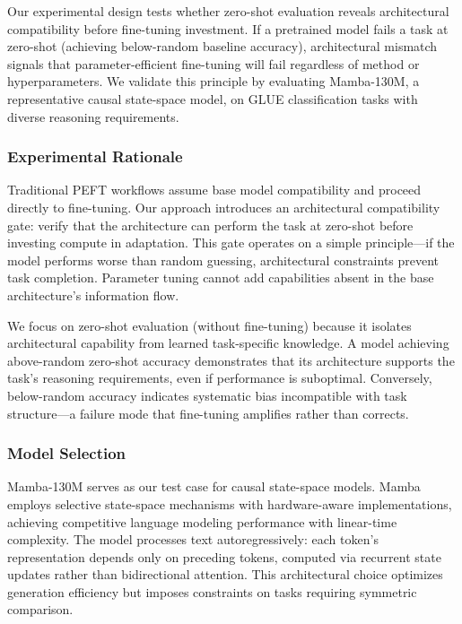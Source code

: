 
Our experimental design tests whether zero-shot evaluation reveals architectural compatibility before fine-tuning investment. If a pretrained model fails a task at zero-shot (achieving below-random baseline accuracy), architectural mismatch signals that parameter-efficient fine-tuning will fail regardless of method or hyperparameters. We validate this principle by evaluating Mamba-130M, a representative causal state-space model, on GLUE classification tasks with diverse reasoning requirements.

\subsubsection{Experimental Rationale}

Traditional PEFT workflows assume base model compatibility and proceed directly to fine-tuning. Our approach introduces an architectural compatibility gate: verify that the architecture can perform the task at zero-shot before investing compute in adaptation. This gate operates on a simple principle---if the model performs worse than random guessing, architectural constraints prevent task completion. Parameter tuning cannot add capabilities absent in the base architecture's information flow.

We focus on zero-shot evaluation (without fine-tuning) because it isolates architectural capability from learned task-specific knowledge. A model achieving above-random zero-shot accuracy demonstrates that its architecture supports the task's reasoning requirements, even if performance is suboptimal. Conversely, below-random accuracy indicates systematic bias incompatible with task structure---a failure mode that fine-tuning amplifies rather than corrects.

\subsubsection{Model Selection}

Mamba-130M serves as our test case for causal state-space models. Mamba employs selective state-space mechanisms with hardware-aware implementations, achieving competitive language modeling performance with linear-time complexity. The model processes text autoregressively: each token's representation depends only on preceding tokens, computed via recurrent state updates rather than bidirectional attention. This architectural choice optimizes generation efficiency but imposes constraints on tasks requiring symmetric comparison.

